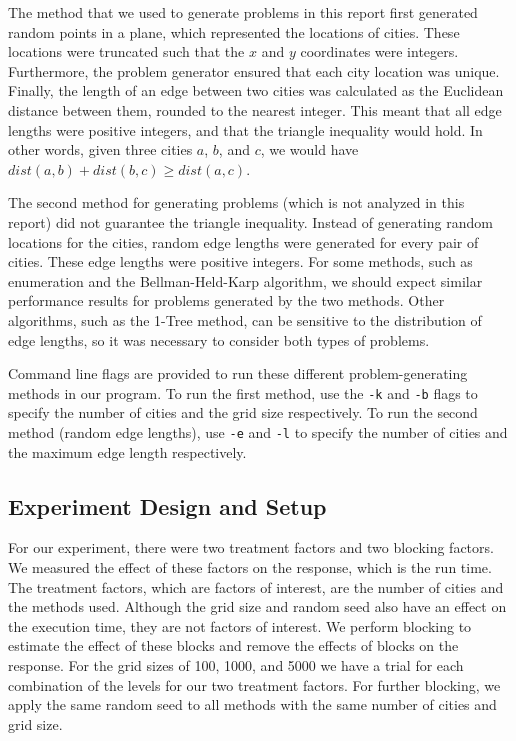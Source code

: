 \documentclass[11pt]{article}
\begin{document}
	The method that we used to generate problems in this report first generated random points in a plane, which represented the locations of cities. These locations were truncated such that the $x$ and $y$ coordinates were integers. Furthermore, the problem generator ensured that each city location was unique. Finally, the length of an edge between two cities was calculated as the Euclidean distance between them, rounded to the nearest integer. This meant that all edge lengths were positive integers, and that the triangle inequality would hold. In other words, given three cities $a$, $b$, and $c$, we would have $dist(a,b) + dist(b,c) \geq dist(a,c)$.
	
	The second method for generating problems (which is not analyzed in this report) did not guarantee the triangle inequality. Instead of generating random locations for the cities, random edge lengths were generated for every pair of cities. These edge lengths were positive integers. For some methods, such as enumeration and the Bellman-Held-Karp algorithm, we should expect similar performance results for problems generated by the two methods. Other algorithms, such as the 1-Tree method, can be sensitive to the distribution of edge lengths, so it was necessary to consider both types of problems.
	
	Command line flags are provided to run these different problem-generating methods in our program. To run the first method, use the \texttt{-k} and \texttt{-b} flags to specify the number of cities and the grid size respectively. To run the second method (random edge lengths), use \texttt{-e} and \texttt{-l} to specify the number of cities and the maximum edge length respectively.
	
	\subsection{Experiment Design and Setup}
	\label{sec:environment}
	For our experiment, there were two treatment factors and two blocking factors. We measured the effect of these factors on the response, which is the run time. The treatment factors, which are factors of interest, are the number of cities and the methods used. Although the grid size and random seed also have an effect on the execution time, they are not factors of interest. We perform blocking to estimate the effect of these blocks and remove  the effects of blocks on the response. For the grid sizes of 100, 1000, and 5000 we have a trial for each combination of the levels for our two treatment factors. For further blocking, we apply the same random seed to all methods with the same number of cities and grid size. 
	
\end{document}
